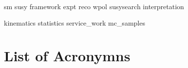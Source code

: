 \documentclass{mythesis}
\title{\mytitle}
\author{Alexander Sparrow}
\begin{document}

\begin{frontmatter}
  
\end{frontmatter}
\begin{mainmatter}
 
 {sm}
 {susy}
 {framework}
 {expt}
 {reco}
 {wpol}
 {susysearch}
 {interpretation}
 
\end{mainmatter}


\begin{comment}
  
  
  
  
  
  
  
  
\end{comment}

\begin{appendices}
 {kinematics}
 {statistics}
 {service_work}
 {mc_samples}
 \chapter{List of Acronymns}
\end{appendices}

\begin{comment}
  
  
  
  
\end{comment}

\begin{backmatter}
  
\end{backmatter}

\end{document}
